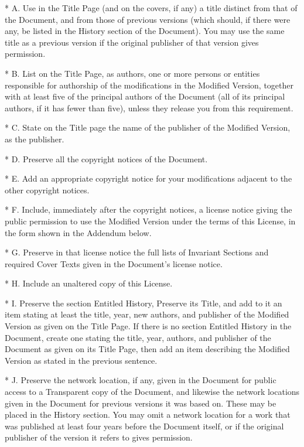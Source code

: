\begin{BookLicense}
* A. Use in the Title Page (and on the covers, if any) a title distinct from that of the Document, and from those of previous versions (which should, if there were any, be listed in the History section of the Document). You may use the same title as a previous version if the original publisher of that version gives permission.

* B. List on the Title Page, as authors, one or more persons or entities responsible for authorship of the modifications in the Modified Version, together with at least five of the principal authors of the Document (all of its principal authors, if it has fewer than five), unless they release you from this requirement.

* C. State on the Title page the name of the publisher of the Modified Version, as the publisher.

* D. Preserve all the copyright notices of the Document.

* E. Add an appropriate copyright notice for your modifications adjacent to the other copyright notices.

* F. Include, immediately after the copyright notices, a license notice giving the public permission to use the Modified Version under the terms of this License, in the form shown in the Addendum below.

* G. Preserve in that license notice the full lists of Invariant Sections and required Cover Texts given in the Document's license notice.

* H. Include an unaltered copy of this License.

* I. Preserve the section Entitled \BookQuoteChar{}History\BookQuoteChar{}, Preserve its Title, and add to it an item stating at least the title, year, new authors, and publisher of the Modified Version as given on the Title Page. If there is no section Entitled \BookQuoteChar{}History\BookQuoteChar{} in the Document, create one stating the title, year, authors, and publisher of the Document as given on its Title Page, then add an item describing the Modified Version as stated in the previous sentence.

* J. Preserve the network location, if any, given in the Document for public access to a Transparent copy of the Document, and likewise the network locations given in the Document for previous versions it was based on. These may be placed in the \BookQuoteChar{}History\BookQuoteChar{} section. You may omit a network location for a work that was published at least four years before the Document itself, or if the original publisher of the version it refers to gives permission.


\end{BookLicense}
